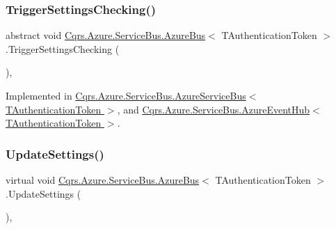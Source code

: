 \subsubsection{\texorpdfstring{Trigger\+Settings\+Checking()}{TriggerSettingsChecking()}}
{\footnotesize\ttfamily abstract void \hyperlink{classCqrs_1_1Azure_1_1ServiceBus_1_1AzureBus}{Cqrs.\+Azure.\+Service\+Bus.\+Azure\+Bus}$<$ T\+Authentication\+Token $>$.Trigger\+Settings\+Checking (\begin{DoxyParamCaption}{ }\end{DoxyParamCaption})\hspace{0.3cm}{\ttfamily [protected]}, {}}



Implemented in \hyperlink{classCqrs_1_1Azure_1_1ServiceBus_1_1AzureServiceBus_ae4b736019e332a81eb08d3696f8b6e7e}{Cqrs.\+Azure.\+Service\+Bus.\+Azure\+Service\+Bus$<$ T\+Authentication\+Token $>$}, and \hyperlink{classCqrs_1_1Azure_1_1ServiceBus_1_1AzureEventHub_a779ce1115cf00dfaf072056a6ad8f9fe}{Cqrs.\+Azure.\+Service\+Bus.\+Azure\+Event\+Hub$<$ T\+Authentication\+Token $>$}.

\mbox{\label{classCqrs_1_1Azure_1_1ServiceBus_1_1AzureBus_aa41ae78c1e674cfd9316c573ca5d1bab}} 
\subsubsection{\texorpdfstring{Update\+Settings()}{UpdateSettings()}}
{\footnotesize\ttfamily virtual void \hyperlink{classCqrs_1_1Azure_1_1ServiceBus_1_1AzureBus}{Cqrs.\+Azure.\+Service\+Bus.\+Azure\+Bus}$<$ T\+Authentication\+Token $>$.Update\+Settings (\begin{DoxyParamCaption}{ }\end{DoxyParamCaption})\hspace{0.3cm}{\ttfamily [protected]}, {\ttfamily [virtual]}}

\mbox{\label{classCqrs_1_1Azure_1_1ServiceBus_1_1AzureBus_a9fa1f5a74819100c40d8079ac6a6adb9}} 
